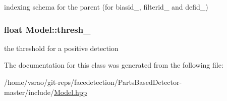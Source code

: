 indexing schema for the parent (for biasid\-\_\-, filterid\-\_\- and defid\-\_\-) 

\hypertarget{classModel_ac2263c14bbd27a5fed433494354e2b02}{
\subsubsection[{thresh\-\_\-}]{\setlength{\rightskip}{0pt plus 5cm}float Model\-::thresh\-\_\-\hspace{0.3cm}{\ttfamily [protected]}}}\label{classModel_ac2263c14bbd27a5fed433494354e2b02}


the threshold for a positive detection 



The documentation for this class was generated from the following file\-:\begin{DoxyCompactItemize}
\item 
/home/vsrao/git-\/reps/facedetection/\-Parts\-Based\-Detector-\/master/include/\hyperlink{Model_8hpp}{Model.\-hpp}\end{DoxyCompactItemize}
